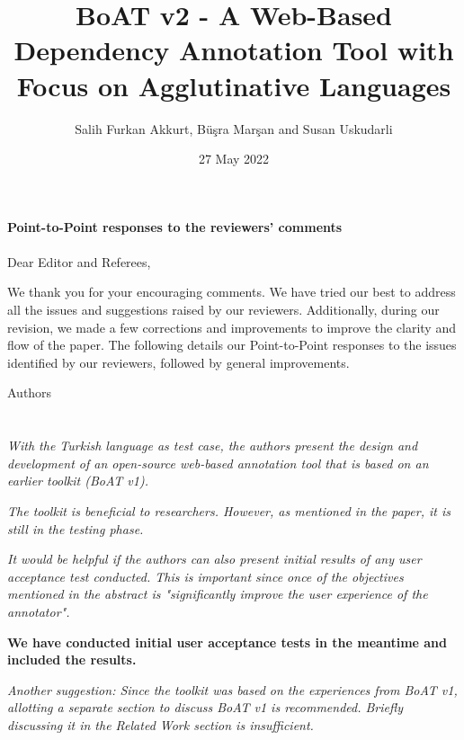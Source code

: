 \documentclass[final,2p]{article}
\newcommand{\comment}{\emph}
\newcommand{\response}{\noindent \textbf}
\begin{document}
%
\title{BoAT v2 - A Web-Based Dependency Annotation Tool with Focus on Agglutinative Languages}%
\author{Salih Furkan Akkurt, Büşra Marşan and Susan Uskudarli}
\date{27 May 2022}

\maketitle

\textbf{Point-to-Point responses to the reviewers' comments}\\\\


Dear Editor and Referees,

We thank you for your encouraging comments. 
We have tried our best to address all the issues and suggestions raised by our reviewers. 
Additionally, during our revision, we made a few corrections and improvements to improve the clarity and flow of the paper. 
The following details our Point-to-Point responses to the issues identified by our reviewers, followed by general improvements.

Authors

\section*{}

\comment{With the Turkish language as test case, the authors present the design and development of an open-source web-based annotation tool that is based on an earlier toolkit (BoAT v1).}

\comment{The toolkit is beneficial to researchers. However, as mentioned in the paper, it is still in the testing phase.}

\comment{It would be helpful if the authors can also present initial results of any user acceptance test conducted. This is important since once of the objectives mentioned in the abstract is "significantly improve the user experience of the annotator".}

\response{We have conducted initial user acceptance tests in the meantime and included the results.}

\comment{Another suggestion: Since the toolkit was based on the experiences from BoAT v1, allotting a separate section to discuss BoAT v1 is recommended. Briefly discussing it in the Related Work section is insufficient.}
\end{document}
